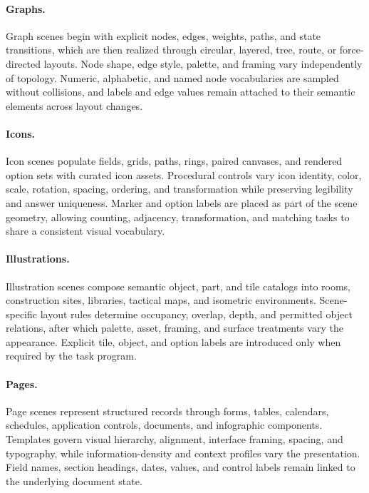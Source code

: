\paragraph{Graphs.}
Graph scenes begin with explicit nodes, edges, weights, paths, and state
transitions, which are then realized through circular, layered, tree, route, or
force-directed layouts. Node shape, edge style, palette, and framing vary
independently of topology. Numeric, alphabetic, and named node vocabularies are
sampled without collisions, and labels and edge values remain attached to
their semantic elements across layout changes.

\paragraph{Icons.}
Icon scenes populate fields, grids, paths, rings, paired canvases, and rendered
option sets with curated icon assets. Procedural controls vary icon identity,
color, scale, rotation, spacing, ordering, and transformation while preserving
legibility and answer uniqueness. Marker and option labels are placed as part
of the scene geometry, allowing counting, adjacency, transformation, and
matching tasks to share a consistent visual vocabulary.

\paragraph{Illustrations.}
Illustration scenes compose semantic object, part, and tile catalogs into
rooms, construction sites, libraries, tactical maps, and isometric
environments. Scene-specific layout rules determine occupancy, overlap, depth,
and permitted object relations, after which palette, asset, framing, and
surface treatments vary the appearance. Explicit tile, object, and option
labels are introduced only when required by the task program.

\paragraph{Pages.}
Page scenes represent structured records through forms, tables, calendars,
schedules, application controls, documents, and infographic components.
Templates govern visual hierarchy, alignment, interface framing, spacing, and
typography, while information-density and context profiles vary the
presentation. Field names, section headings, dates, values, and control labels
remain linked to the underlying document state.

